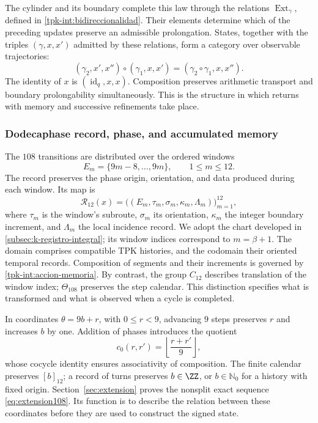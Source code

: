 The cylinder and its boundary complete this law through the relations
\(\operatorname{Ext}_\gamma\), defined in
\ref{tpk-int:bidireccionalidad}. Their elements determine which of
the preceding updates preserve an admissible prolongation.
States, together with the triples \((\gamma,x,x')\) admitted by
these relations, form a category over observable trajectories:
\[
 (\gamma_2,x',x'')\circ(\gamma_1,x,x')
     =(\gamma_2\circ\gamma_1,x,x'').
\]
The identity of \(x\) is \((\operatorname{id}_q,x,x)\).
Composition preserves arithmetic transport and boundary prolongability
simultaneously. This is the structure in which returns with memory
and successive refinements take place.

\subsubsection{Dodecaphase record, phase, and accumulated memory}
\label{tpk-int:dodecafase}

The \(108\) transitions are distributed over the ordered windows
\[
 E_m=\{9m-8,\ldots,9m\},\qquad 1\leq m\leq12.
\]
The record preserves the phase origin, orientation, and data
produced during each window. Its map is
\[
 \mathcal R_{12}(x)=
 \bigl((E_m,\tau_m,\sigma_m,\kappa_m,\Lambda_m)\bigr)_{m=1}^{12},
\]
where \(\tau_m\) is the window's subroute, \(\sigma_m\) its
orientation, \(\kappa_m\) the integer boundary increment, and
\(\Lambda_m\) the local incidence record. We adopt the chart
developed in \ref{subsec:k-registro-integral}; its window indices
correspond to \(m=\beta+1\).
The domain comprises compatible TPK histories, and the codomain
their oriented temporal records. Composition of segments and their
increments is governed by \eqref{tpk-int:accion-memoria}.
By contrast, the group \(C_{12}\) describes translation of the
window index; \(\Theta_{108}\) preserves the step calendar.
This distinction specifies what is transformed and what is observed
when a cycle is completed.

In coordinates \(\theta=9b+r\), with \(0\leq r<9\), advancing
\(9\) steps preserves \(r\) and increases \(b\) by one.
Addition of phases introduces the quotient
\[
 c_0(r,r')=\left\lfloor\frac{r+r'}9\right\rfloor,
\]
whose cocycle identity ensures associativity of composition.
The finite calendar preserves \([b]_{12}\); a record of turns
preserves \(b\in\ZZ\), or \(b\in\mathbb N_0\) for a
history with fixed origin. Section~\ref{sec:extension} proves
the nonsplit exact sequence \eqref{eq:extension108}. Its function
is to describe the relation between these coordinates before they
are used to construct the signed state.

